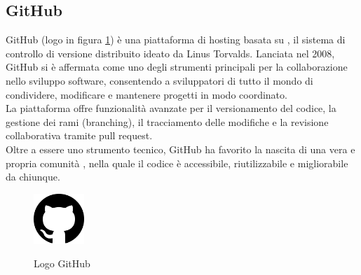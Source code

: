 \subsection{GitHub}
\label{subsec:github}
\noindent GitHub (logo in figura \ref{fig:logo_github}) è una piattaforma di hosting basata su , il sistema di controllo di versione distribuito ideato da Linus Torvalds. Lanciata nel 2008, GitHub si è affermata come uno degli strumenti principali per la collaborazione nello sviluppo software, consentendo a sviluppatori di tutto il mondo di condividere, modificare e mantenere progetti in modo coordinato. \\La piattaforma offre funzionalità avanzate per il versionamento del codice, la gestione dei rami (branching), il tracciamento delle modifiche e la revisione collaborativa tramite pull request. \\Oltre a essere uno strumento tecnico, GitHub ha favorito la nascita di una vera e propria comunità , nella quale il codice è accessibile, riutilizzabile e migliorabile da chiunque.
\begin{figure}[H]
    \centering
    \includegraphics[width=0.17\textwidth, alt={Logo GitHub}]{img/github.png}
    \caption[Logo GitHub]{Logo GitHub}\label{fig:logo_github}
\end{figure}

